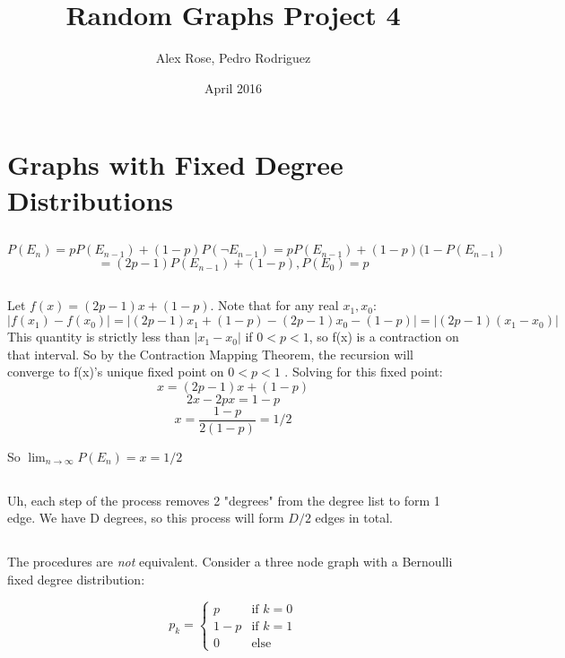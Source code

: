 \documentclass{article}
\title{Random Graphs Project 4}
\author{Alex Rose, Pedro Rodriguez}
\date{April 2016}
\begin{document}
\maketitle

\section{ Graphs with Fixed Degree Distributions}

\subsection{ }

$$P(E_n) = pP(E_{n-1}) + (1-p)P(\neg E_{n-1}) = pP(E_{n-1}) + (1-p)(1- P(E_{n-1}) $$
$$ = (2p-1)P(E_{n-1}) + (1 - p), P(E_0) = p$$

\subsection{} 
Let $f(x) = (2p -1)x + (1-p)$. Note that for any real $x_1,x_0$:
$$|f(x_1) - f(x_0)| = |(2p-1)x_1 + (1-p) - (2p-1)x_0 - (1-p)| = |(2p-1)(x_1-x_0)|$$
This quantity is strictly less than $|x_1-x_0|$ if $0 < p < 1$, so f(x) is a contraction on that interval. So by the Contraction Mapping Theorem, the recursion will converge to f(x)'s unique fixed point on $0 < p < 1$ .  Solving for this fixed point:
$$x = (2p-1)x + (1-p)$$
$$2x - 2px = 1-p$$
$$x = \frac{1-p}{2(1-p)} = 1/2$$

So $\lim_{n\to\infty} P(E_{n})= x = 1/2$

\subsection{}
Uh, each step of the process removes 2 "degrees" from the degree list to form 1 edge. We have D degrees, so this process will form $D/2$ edges in total.

\subsection{}
The procedures are \textit{not} equivalent. Consider a three node graph with a Bernoulli fixed degree distribution:

$$p_k = \begin{cases}
  p & \text{if } k = 0 \\
  1-p & \text{if } k = 1 \\
  0 & \text{else}
\end{cases}$$
\end{document}
